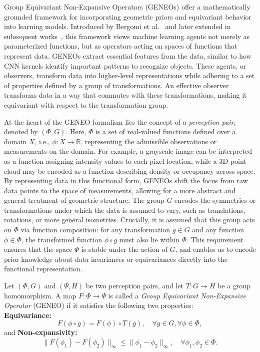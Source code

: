Group Equivariant Non-Expansive Operators (GENEOs) offer a mathematically
grounded framework for incorporating geometric priors and equivariant behavior
into learning models. Introduced by Bergomi et al.~\cite{bergomi2019towards}
and later extended in subsequent
works~\cite{cascarano2021geometric,conti2022construction}, this framework views
machine learning agents not merely as parameterized functions, but as operators
acting on spaces of functions that represent data.
%
GENEOs extract essential features from the data, similar to how CNN kernels
identify important patterns to recognize objects. These agents, or observers,
transform data into higher-level representations while adhering to a set of
properties defined by a group of transformations. An effective observer
transforms data in a way that commutes with these transformations, making it
equivariant with respect to the transformation group.

At the heart of the GENEO formalism lies the concept of a \emph{perception
    pair}, denoted by $(\Phi, G)$. Here, $\Phi$ is a set of real-valued functions
defined over a domain $X$, i.e., $\phi: X \rightarrow \mathbb{R}$, representing
the admissible observations or measurements on the domain.
%
For example, a grayscale image can be interpreted as a function assigning
intensity values to each pixel location, while a 3D point cloud may be encoded
as a function describing density or occupancy across space.
%
By representing data in this functional form, GENEOs shift the focus from raw
data points to the space of measurements, allowing for a more abstract and
general treatment of geometric structure.
%
The group $G$ encodes the symmetries or transformations under which the data is
assumed to vary, such as translations, rotations, or more general isometries.
Crucially, it is assumed that this group acts on $\Phi$ via function
composition: for any transformation $g \in G$ and any function $\phi \in \Phi$,
the transformed function $\phi \circ g$ must also lie within $\Phi$. This
requirement ensures that the space $\Phi$ is stable under the action of $G$,
and enables us to encode prior knowledge about data invariances or
equivariances directly into the functional representation.

\begin{definition}
    Let $(\Phi, G)$ and $(\Psi, H)$ be two perception pairs,
    and let $T: G \rightarrow H$ be a group homomorphism.
    A map $F: \Phi \rightarrow \Psi$ is called a
    \emph{Group Equivariant Non-Expansive Operator} (GENEO)
    if it satisfies the following two properties:\\
    \textbf{Equivariance:}
    \begin{equation}
        F(\phi \circ g) = F(\phi) \circ T(g), \quad \forall g \in G, \forall \phi \in \Phi,
    \end{equation}
    and \textbf{Non-expansivity:}
    \begin{equation}
        \|F(\phi_1) - F(\phi_2)\|_\infty \leq \|\phi_1 - \phi_2\|_\infty, \quad \forall \phi_1, \phi_2 \in \Phi.
    \end{equation}

\end{definition}

